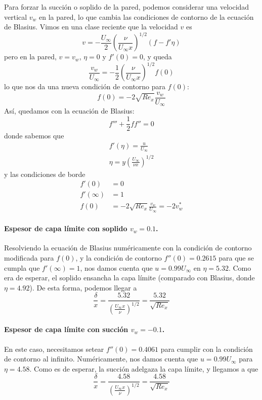 Para forzar la succión o soplido de la pared, podemos considerar una velocidad vertical $v_w$ en la pared, lo que cambia las condiciones de contorno de la ecuación de Blasius. Vimos en una clase reciente que la velocidad $v$ es
%
\begin{equation}
v = -\frac{U_\infty}{2}\left(\frac{\nu}{U_\infty x}\right)^{1/2}(f-f'\eta)
\end{equation}
%
pero en la pared, $v=v_w$, $\eta=0$ y $f'(0)=0$, y queda
%
\begin{equation}
\frac{v_w}{U_\infty} = -\frac{1}{2}\left(\frac{\nu}{U_\infty x}\right)^{1/2}f(0)
\end{equation}
%
lo que nos da una nueva condición de contorno para $f(0)$:
%
\begin{equation}
f(0) = -2\sqrt{Re_x}\frac{v_w}{U_\infty}
\end{equation}
%
Así, quedamos con la ecuación de Blasius:
%
\begin{equation}
f'''+\frac{1}{2}ff''=0
\end{equation}
%
donde sabemos que
%
\begin{align}
f'(\eta) = \frac{u}{U_\infty}\\
\eta = y\left(\frac{U_\infty}{\nu x}\right)^{1/2}
\end{align}
%
y las condiciones de borde
%
\begin{align}
f'(0) &= 0\\
f'(\infty) &= 1\\
f(0) &= -2\sqrt{Re_x}\frac{v_w}{U_\infty}=-2v_w^*
\end{align}

\paragraph*{Espesor de capa límite con soplido $v_w=0.1$.}
Resolviendo la ecuación de Blasius numéricamente con la condición de contorno modificada para $f(0)$, y la condición de contorno $f''(0)=0.2615$ para que se cumpla que $f'(\infty)=1$, nos damos cuenta que $u=0.99U_\infty$ en $\eta=5.32$. 
Como era de esperar, el soplido ensancha la capa límite (comparado con Blasius, donde $\eta=4.92$). De esta forma, podemos llegar a 
%
\begin{equation}
\frac{\delta}{x}=\frac{5.32}{\left(\frac{U_\infty x}{\nu}\right)^{1/2}} = \frac{5.32}{\sqrt{Re_x}} 
\end{equation}

\paragraph*{Espesor de capa límite con succión $v_w=-0.1$.}
En este caso, necesitamos setear $f''(0) = 0.4061$ para cumplir con la condición de contorno al infinito.
Numéricamente, nos damos cuenta que $u=0.99U_\infty$ para $\eta=4.58$. Como es de esperar, la succión adelgaza la capa límite, y llegamos a que
%
\begin{equation}
\frac{\delta}{x}=\frac{4.58}{\left(\frac{U_\infty x}{\nu}\right)^{1/2}} = \frac{4.58}{\sqrt{Re_x}} 
\end{equation}
